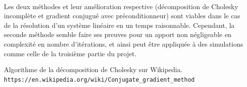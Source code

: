 \documentclass{article}
\begin{document}
\paragraph{}
    Les deux méthodes et leur amélioration respective (décomposition de Cholesky
    incomplète et gradient conjugué avec préconditionneur) sont viables dans le 
    cas de la résolution d'un système linéaire en un temps raisonnable. 
    Cependant, la seconde méthode semble faire ses preuves pour un apport non 
    négligeable en complexité en nombre d'itérations, et ainsi peut être appliquée 
    à des simulations comme celle de la troisième partie du projet.

\begin{thebibliography}{9}
Algorithme de la décomposition de Cholesky sur Wikipedia.
\\\texttt{https://en.wikipedia.org/wiki/Conjugate\_gradient\_method}
\end{thebibliography}
\end{document}
